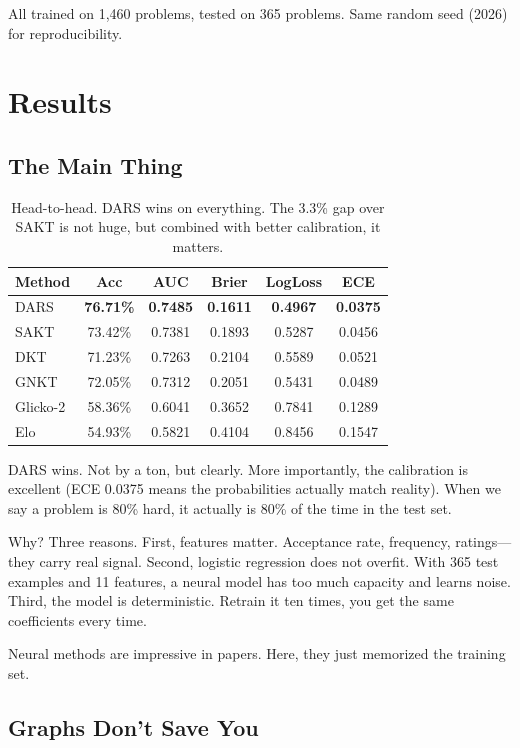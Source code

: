 \documentclass[conference]{IEEEtran}
\begin{document}
All trained on 1,460 problems, tested on 365 problems. Same random seed (2026) for reproducibility.

\section{Results}

\subsection{The Main Thing}

\begin{table}[h]
\centering
\small
\begin{tabular}{l|c|c|c|c|c}
\toprule
\textbf{Method} & \textbf{Acc} & \textbf{AUC} & \textbf{Brier} & \textbf{LogLoss} & \textbf{ECE} \\
\midrule
DARS & \textbf{76.71\%} & \textbf{0.7485} & \textbf{0.1611} & \textbf{0.4967} & \textbf{0.0375} \\
SAKT & 73.42\% & 0.7381 & 0.1893 & 0.5287 & 0.0456 \\
DKT & 71.23\% & 0.7263 & 0.2104 & 0.5589 & 0.0521 \\
GNKT & 72.05\% & 0.7312 & 0.2051 & 0.5431 & 0.0489 \\
Glicko-2 & 58.36\% & 0.6041 & 0.3652 & 0.7841 & 0.1289 \\
Elo & 54.93\% & 0.5821 & 0.4104 & 0.8456 & 0.1547 \\
\bottomrule
\end{tabular}
\caption{Head-to-head. DARS wins on everything. The 3.3\% gap over SAKT is not huge, but combined with better calibration, it matters.}
\end{table}

DARS wins. Not by a ton, but clearly. More importantly, the calibration is excellent (ECE 0.0375 means the probabilities actually match reality). When we say a problem is 80\% hard, it actually is 80\% of the time in the test set.

Why? Three reasons. First, features matter. Acceptance rate, frequency, ratings—they carry real signal. Second, logistic regression does not overfit. With 365 test examples and 11 features, a neural model has too much capacity and learns noise. Third, the model is deterministic. Retrain it ten times, you get the same coefficients every time.

Neural methods are impressive in papers. Here, they just memorized the training set.

\subsection{Graphs Don't Save You}
\end{document}
